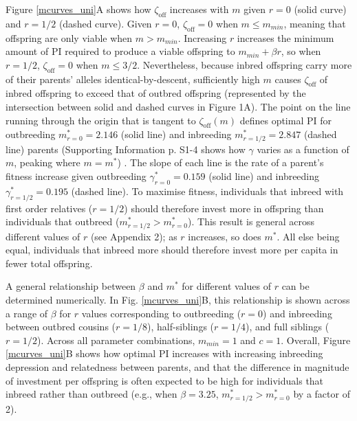\documentclass[12pt]{article}
\begin{document}
Figure \ref{mcurves_uni}A shows how $\zeta_{\textrm{off}}$ increases with $m$ given $r=0$ (solid curve) and $r=1/2$ (dashed curve). Given $r=0$, $\zeta_{\textrm{off}}=0$ when $m \leq m_{min}$, meaning that offspring are only viable when $m>m_{min}$. Increasing $r$ increases the minimum amount of PI required to produce a viable offspring to $m_{min}+\beta r$, so when $r=1/2$, $\zeta_{\textrm{off}}=0$ when $m \leq 3/2$. Nevertheless, because inbred offspring carry more of their parents' alleles identical-by-descent, sufficiently high $m$ causes $\zeta_{\textrm{off}}$ of inbred offspring to exceed that of outbred offspring (represented by the intersection between solid and dashed curves in Figure 1A). The point on the line running through the origin that is tangent to $\zeta_{\textrm{off}}(m)$ defines optimal PI for outbreeding $m^{*}_{r=0}=2.146$ (solid line) and inbreeding $m^{*}_{r=1/2}=2.847$ (dashed line) parents (Supporting Information p. S1-4 shows how $\gamma$ varies as a function of $m$, peaking where $m=m^{*}$) . The slope of each line is the rate of a parent's fitness increase given outbreeding $\gamma^{*}_{r=0}=0.159$ (solid line) and inbreeding $\gamma^{*}_{r=1/2}=0.195$ (dashed line). To maximise fitness, individuals that inbreed with first order relatives ($r=1/2$) should therefore invest more in offspring than individuals that outbreed ($m^{*}_{r=1/2}>m^{*}_{r=0}$). This result is general across different values of $r$ (see Appendix 2); as $r$ increases, so does $m^{*}$. All else being equal, individuals that inbreed more should therefore invest more per capita in fewer total offspring.

A general relationship between $\beta$ and $m^{*}$ for different values of $r$ can be determined numerically. In Fig. \ref{mcurves_uni}B, this relationship is shown across a range of $\beta$ for $r$ values corresponding to outbreeding ($r=0$) and inbreeding between outbred cousins ($r=1/8$), half-siblings ($r=1/4$), and full siblings ($r=1/2$). Across all parameter combinations, $m_{min}=1$ and $c=1$. Overall, Figure \ref{mcurves_uni}B shows how optimal PI increases with increasing inbreeding depression and relatedness between parents, and that the difference in magnitude of investment per offspring is often expected to be high for individuals that inbreed rather than outbreed (e.g., when $\beta=3.25$, $m^{*}_{r=1/2} > m^{*}_{r=0}$ by a factor of 2). 
\end{document}
